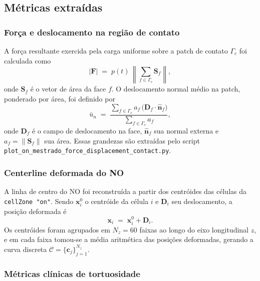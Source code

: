 \subsection{Métricas extraídas}
\label{sec:metodologia-metricas}

\subsubsection{Força e deslocamento na região de contato}

A força resultante exercida pela carga uniforme sobre a patch de contato
\(\Gamma_c\) foi calculada como
\begin{equation}
  \lvert \mathbf{F} \rvert
  \;=\;
  p(t)\,
  \left\lVert \sum_{f \in \Gamma_c} \mathbf{S}_f \right\rVert,
  \label{eq:forca}
\end{equation}
onde \(\mathbf{S}_f\) é o vetor de área da face \(f\). O deslocamento normal
médio na patch, ponderado por área, foi definido por
\begin{equation}
  \bar{u}_n
  \;=\;
  \frac{\displaystyle \sum_{f \in \Gamma_c} a_f \, \bigl(\mathbf{D}_f \cdot \hat{\mathbf{n}}_f\bigr)}
       {\displaystyle \sum_{f \in \Gamma_c} a_f},
  \label{eq:un}
\end{equation}
onde \(\mathbf{D}_f\) é o campo de deslocamento na face, \(\hat{\mathbf{n}}_f\)
sua normal externa e \(a_f = \lVert \mathbf{S}_f \rVert\) sua área. Essas
grandezas são extraídas pelo script
\texttt{plot\_on\_mestrado\_force\_displacement\_contact.py}.

\subsubsection{Centerline deformada do NO}

A linha de centro do NO foi reconstruída a partir dos centróides das células
da \texttt{cellZone "on"}. Sendo \(\mathbf{x}_i^{0}\) o centróide da célula
\(i\) e \(\mathbf{D}_i\) seu deslocamento, a posição deformada é
\begin{equation}
  \mathbf{x}_i \;=\; \mathbf{x}_i^{0} + \mathbf{D}_i.
\end{equation}
Os centróides foram agrupados em \(N_z = 60\) faixas ao longo do eixo
longitudinal \(z\), e em cada faixa tomou-se a média aritmética das posições
deformadas, gerando a curva discreta
\(\mathcal{C} = \{ \mathbf{c}_j \}_{j=1}^{N_z}\).

\subsubsection{Métricas clínicas de tortuosidade}

